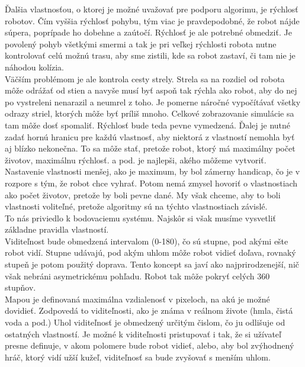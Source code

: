 \indent Ďalšia vlastnosťou,  o ktorej je možné uvažovať pre podporu algorimu, je rýchlosť robotov. %
Čím vyššia rýchlosť pohybu, tým viac je pravdepodobné, že robot nájde súpera, poprípade ho dobehne a zaútočí. Rýchlosť je ale potrebné obmedziť. Je povolený pohyb všetkými smermi a tak je pri veľkej rýchlosti robota nutne kontrolovať celú možnú trasu, aby sme zistili, kde sa robot zastaví, či tam nie je náhodou kolízia. \\
\indent Väčším problémom je ale kontrola cesty strely. Strela sa na rozdiel od robota môže odrážať od stien a navyše musí byť aspoň tak rýchla ako robot, aby do nej po vystreleni nenarazil a neumrel z toho. Je pomerne náročné vypočítávať všetky odrazy striel, ktorých môže byť príliš mnoho. Celkové zobrazovanie simulácie sa tam môže dosť spomaliť. Rýchlosť bude teda pevne vymedzená. %
\indent Ďalej je nutné  zadať hornú hranicu pre každú vlastnosť, aby niektorá z vlastností nemohla byť aj blízko nekonečna. To sa môže stať, pretože robot, ktorý má maximálny počet životov, maximálnu rýchlosť. a pod. je najlepši, akého môžeme vytvoriť. Nastavenie vlastnosti menšej, ako je maximum, by bol zámerny handicap, čo je v rozpore s tým, že robot chce vyhrať. Potom nemá zmysel hovoriť o vlastnostiach ako počet životov, pretože by boli pevne dané. My však chceme, aby to boli vlastnosti voliteľné, pretože algoritmy sú na týchto vlastnostiach závislé. \\ %
To nás priviedlo k bodovaciemu  systému. Najskôr si však musíme vysvetliť základne pravidla vlastností.\\
Viditeľnost bude obmedzená intervalom (0-180), čo sú stupne, pod akými ešte robot vidí. Stupne udávajú, pod akým uhlom môže robot vidieť doľava, rovnaký stupeň je potom použitý doprava. Tento koncept sa javí ako najprirodzenejší, nič však nebráni asymetrickému pohľadu. Robot tak môže pokryť celých 360 stupňov.\\
Mapou je definovaná maximálna vzdialenosť v pixeloch, na akú je možné dovidieť. Zodpovedá to viditeľnosti, ako je známa v reálnom živote (hmla, čistá voda a pod.)
\indent Uhol viditeľnosť je obmedzený určitým čislom, čo ju odlišuje od ostatných vlastností. Je možné k viditeľnosti pristupovať i tak, že si užívateľ presne definuje, v akom polomere bude robot vidieť, alebo, aby bol zvýhodnený hráč, ktorý vidí užší kužeľ, viditeľnosť sa bude zvyšovať s menším uhlom. %
